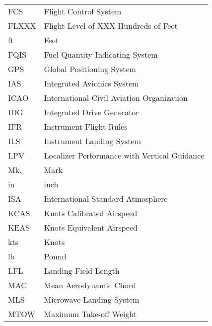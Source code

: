 {\begin{longtable*}{@{}l @{\quad=\quad} l@{}}
    FCS & Flight Control System \\
    FLXXX & Flight Level of XXX Hundreds of Feet \\
    ft & Feet \\
    FQIS & Fuel Quantity Indicating System \\
    GPS & Global Positioning System \\
    IAS & Integrated Avionics System \\
    ICAO & International Civil Aviation Organization \\
    IDG & Integrated Drive Generator \\
    IFR & Instrument Flight Rules \\
    ILS & Instrument Landing System \\
    LPV & Localizer Performance with Vertical Guidance \\
    Mk. & Mark \\
    in & inch \\
    ISA & International Standard Atmosphere \\
    KCAS & Knots Calibrated Airspeed \\
    KEAS & Knots Equivalent Airspeed \\
    kts & Knots \\
    lb & Pound \\
    LFL & Landing Field Length \\
    MAC & Mean Aerodynamic Chord \\
    MLS & Microwave Landing System \\
    MTOW & Maximum Take-off Weight \\

\end{longtable*}}
